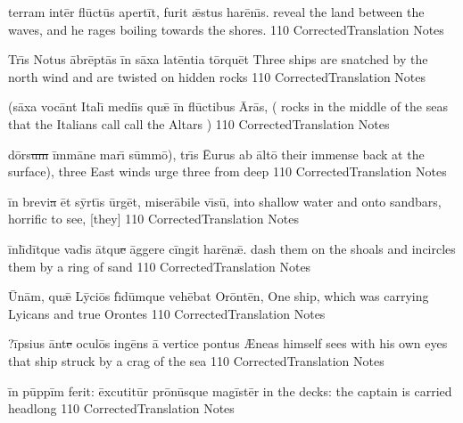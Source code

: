 \documentclass[]{book}
\begin{document}
	\latline
	  {t\-err\-am \-int\=er fl\={\macron u}ct\={\macron u}s \-ap\-ert\=it, f\-ur\-it \={\ae}st\-us h\-ar\={\macron e}n\={\macron \i}s.}
	  { reveal the land between the waves, and he rages boiling towards the shores. }
	  {110}
	  { CorrectedTranslation }
	  { Notes }


	\latline
	  {Tr\={\macron \i}s N\-ot\-us \=abr\=ept\={\macron a}s \=in s\=ax\-a l\-at\=ent\-i\-a t\=orqu\=et}
	  { Three ships are snatched by the north wind and are twisted on hidden rocks }
	  {110}
	  { CorrectedTranslation }
	  { Notes }


	\latline
	  {(s\=ax\-a v\-oc\=ant \-It\-al\={\macron \i} m\-edi\={\macron \i}s qu\={\ae} \=in fl\={\macron u}ct\-ib\-us \={\macron A}r\={\macron a}s,}
	  { ( rocks in the middle of the seas that the Italians call call the Altars )   }
	  {110}
	  { CorrectedTranslation }
	  { Notes }


	\newpage

	\latline
	  {d\=ors\sout{um }\=imm\={\macron a}n\-e m\-ar\={\macron \i} s\=umm\={\macron o}), tr\={\macron \i}s \={Eu}r\-us \-ab \=alt\={\macron o}}
	  { their immense back at the surface), three East winds urge three from deep }
	  {110}
	  { CorrectedTranslation }
	  { Notes }


	\latline
	  {\=in br\-ev\-i\sout{a }\=et s\=yrt\={\macron \i}s \=urg\=et, m\-is\-er\={\macron a}b\-il\-e v\={\macron \i}s\={\macron u},}
	  { into shallow water and onto sandbars, horrific to see, [they] }
	  {110}
	  { CorrectedTranslation }
	  { Notes }


	\latline
	  {\=inl\={\macron \i}d\=itqu\-e v\-ad\={\macron \i}s \=atqu\sout{e }\=agg\-er\-e c\=ing\-it h\-ar\={\macron e}n\={\ae}.}
	  { dash them on the shoals and incircles them by a ring of sand }
	  {110}
	  { CorrectedTranslation }
	  { Notes }


	\newpage

	\latline
	  {\={\macron U}n\=am, qu\={\ae} L\=yci\={\macron o}s f\={\macron \i}d\=umqu\-e v\-eh\={\macron e}b\-at \-Or\=ont\={\macron e}n,}
	  { One ship, which was carrying Lyicans and true Orontes }
	  {110}
	  { CorrectedTranslation }
	  { Notes }


	\latline
	  {?\=ips\-i\-us \=ant\sout{e }\-oc\-ul\={\macron o}s ing\={\macron e}ns \={\macron a} vertice pontus}
	  { {\AE}neas himself sees with his own eyes that ship struck by a crag of the sea }
	  {110}
	  { CorrectedTranslation }
	  { Notes }


	\latline
	  {\=in p\=upp\=im fe\-r\-it:  \=exc\-ut\-it\=ur pr\={\macron o}n\=usqu\-e m\-ag\=ist\=er}
	  { in the decks: the captain is carried headlong }
	  {110}
	  { CorrectedTranslation }
	  { Notes }
\end{document}
